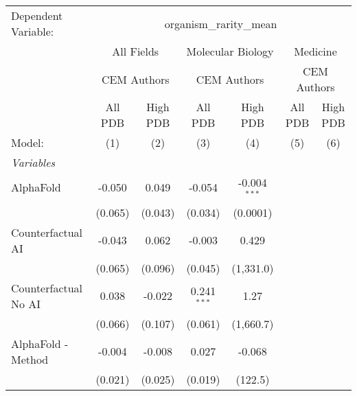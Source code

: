 \begingroup
\centering
\begin{tabular}{lcccccc}
   \tabularnewline \midrule \midrule
   Dependent Variable: & \multicolumn{6}{c}{organism\_rarity\_mean}\\
 & \multicolumn{2}{c}{All Fields} & \multicolumn{2}{c}{Molecular Biology} & \multicolumn{2}{c}{Medicine} \\
\cmidrule(lr){2-3} \cmidrule(lr){4-5} \cmidrule(lr){6-7}
 & \multicolumn{2}{c}{CEM Authors} & \multicolumn{2}{c}{CEM Authors} & \multicolumn{2}{c}{CEM Authors} \\
\cmidrule(lr){2-3} \cmidrule(lr){4-5} \cmidrule(lr){6-7}
 & \multicolumn{1}{c}{All PDB} & \multicolumn{1}{c}{High PDB} & \multicolumn{1}{c}{All PDB} & \multicolumn{1}{c}{High PDB} & \multicolumn{1}{c}{All PDB} & \multicolumn{1}{c}{High PDB} \\
\cmidrule(lr){2-2} \cmidrule(lr){3-3} \cmidrule(lr){4-4} \cmidrule(lr){5-5} \cmidrule(lr){6-6} \cmidrule(lr){7-7}
   Model:                                                     & (1)     & (2)       & (3)           & (4)            & (5) & (6)\\  
   \midrule
   \emph{Variables}\\
   AlphaFold                                                  & -0.050  & 0.049     & -0.054        & -0.004$^{***}$ &     &   \\   
                                                              & (0.065) & (0.043)   & (0.034)       & (0.0001)       &     &   \\   
   Counterfactual AI                                          & -0.043  & 0.062     & -0.003        & 0.429          &     &   \\   
                                                              & (0.065) & (0.096)   & (0.045)       & (1,331.0)      &     &   \\   
   Counterfactual No AI                                       & 0.038   & -0.022    & 0.241$^{***}$ & 1.27           &     &   \\   
                                                              & (0.066) & (0.107)   & (0.061)       & (1,660.7)      &     &   \\   
   AlphaFold - Method                                         & -0.004  & -0.008    & 0.027         & -0.068         &     &   \\   
                                                              & (0.021) & (0.025)   & (0.019)       & (122.5)        &     &   \\   

\end{tabular}
